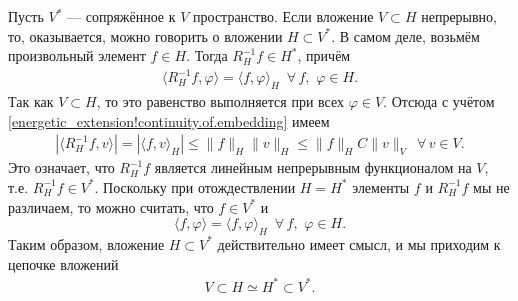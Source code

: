 \documentclass{report}
\begin{document}
Пусть $V^*$ --- сопряжённое к $V$ пространство. Если вложение $V\subset H$ непрерывно, то, оказывается, можно говорить о вложении $H\subset V^*$. В самом деле, возьмём произвольный элемент
$f\in H$. Тогда $R_H^{-1}f\in H^*$, причём
\begin{gather*}
\langle R_H^{-1}f,\varphi\rangle=\langle f,\varphi\rangle_H\,\,\,\forall\,f,\,\,\varphi\in H.
\end{gather*}
Так как $V\subset H$, то это равенство выполняется при всех $\varphi\in V$. Отсюда с учётом \eqref{energetic_extension!continuity.of.embedding} имеем
\begin{gather}\label{energetic_extension!RH-1continuity}
|\langle R_H^{-1}f,v\rangle|=|\langle f,v\rangle_H|\leqslant\|f\|_H\|v\|_H\leqslant\|f\|_HC\|v\|_V\,\,\,\forall\, v\in V.
\end{gather}
Это означает, что $R_H^{-1}f$ является линейным непрерывным функционалом на $V$, т.е. $R_H^{-1}f\in V^*$. Поскольку при отождествлении $H=H^*$ элементы $f$ и $R_H^{-1}f$ мы не различаем,
то можно считать, что $f\in V^*$ и
$$
\langle f,\varphi\rangle=\langle f,\varphi\rangle_H\,\,\,\forall\,f,\,\,\varphi\in H.
$$
Таким образом, вложение $H\subset V^*$ действительно имеет смысл, и мы приходим к цепочке вложений
\begin{gather}\label{energetic_extension!embeddings.chain}
V\subset H\simeq H^*\subset V^*.
\end{gather}
\end{document}
